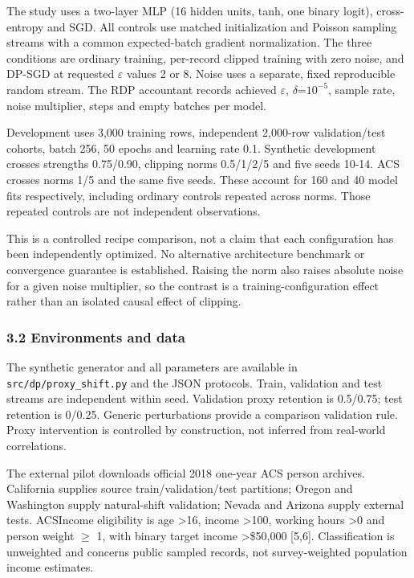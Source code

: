 \documentclass[
  10pt,
]{article}
\begin{document}
The study uses a two-layer MLP (16 hidden units, tanh, one binary
logit), cross-entropy and SGD. All controls use matched initialization
and Poisson sampling streams with a common expected-batch gradient
normalization. The three conditions are ordinary training, per-record
clipped training with zero noise, and DP-SGD at requested
\(\varepsilon\) values 2 or 8. Noise uses a separate, fixed reproducible
random stream. The RDP accountant records achieved \(\varepsilon\),
\(\delta\)=\(10^{-5}\), sample rate, noise multiplier, steps and empty
batches per model.

Development uses 3,000 training rows, independent 2,000-row
validation/test cohorts, batch 256, 50 epochs and learning rate 0.1.
Synthetic development crosses strengths 0.75/0.90, clipping norms
0.5/1/2/5 and five seeds 10-14. ACS crosses norms 1/5 and the same five
seeds. These account for 160 and 40 model fits respectively, including
ordinary controls repeated across norms. Those repeated controls are not
independent observations.

This is a controlled recipe comparison, not a claim that each
configuration has been independently optimized. No alternative
architecture benchmark or convergence guarantee is established. Raising
the norm also raises absolute noise for a given noise multiplier, so the
contrast is a training-configuration effect rather than an isolated
causal effect of clipping.

\hypertarget{environments-and-data}{%
\subsubsection{3.2 Environments and data}\label{environments-and-data}}

The synthetic generator and all parameters are available in
\texttt{src/dp/proxy\_shift.py} and the JSON protocols. Train,
validation and test streams are independent within seed. Validation
proxy retention is 0.5/0.75; test retention is 0/0.25. Generic
perturbations provide a comparison validation rule. Proxy intervention
is controlled by construction, not inferred from real-world
correlations.

The external pilot downloads official 2018 one-year ACS person archives.
California supplies source train/validation/test partitions; Oregon and
Washington supply natural-shift validation; Nevada and Arizona supply
external tests. ACSIncome eligibility is age \textgreater16, income
\textgreater100, working hours \textgreater0 and person weight \(\geq\)
1, with binary target income \textgreater\$50,000 {[}5,6{]}.
Classification is unweighted and concerns public sampled records, not
survey-weighted population income estimates.
\end{document}
